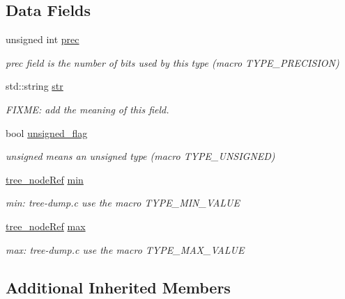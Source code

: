 \subsection*{Data Fields}
\begin{DoxyCompactItemize}
\item 
unsigned int \hyperlink{structinteger__type_a2ef406fca15b8099f36caa9e7af56a8f}{prec}
\begin{DoxyCompactList}\small\item\em prec field is the number of bits used by this type (macro T\+Y\+P\+E\+\_\+\+P\+R\+E\+C\+I\+S\+I\+ON) \end{DoxyCompactList}\item 
std\+::string \hyperlink{structinteger__type_a734d8c7ea62046a0bb29a0c162aeb5dd}{str}
\begin{DoxyCompactList}\small\item\em F\+I\+X\+ME\+: add the meaning of this field. \end{DoxyCompactList}\item 
bool \hyperlink{structinteger__type_afa53c2ecd072946b7a3eb8c3db186297}{unsigned\+\_\+flag}
\begin{DoxyCompactList}\small\item\em unsigned means an unsigned type (macro T\+Y\+P\+E\+\_\+\+U\+N\+S\+I\+G\+N\+ED) \end{DoxyCompactList}\item 
\hyperlink{tree__node_8hpp_a6ee377554d1c4871ad66a337eaa67fd5}{tree\+\_\+node\+Ref} \hyperlink{structinteger__type_aa20c7b9a0e31604abba7c9c6ab9e3c85}{min}
\begin{DoxyCompactList}\small\item\em min\+: tree-\/dump.\+c use the macro T\+Y\+P\+E\+\_\+\+M\+I\+N\+\_\+\+V\+A\+L\+UE \end{DoxyCompactList}\item 
\hyperlink{tree__node_8hpp_a6ee377554d1c4871ad66a337eaa67fd5}{tree\+\_\+node\+Ref} \hyperlink{structinteger__type_a85713610c9a1ff37771373ed2faf0e0a}{max}
\begin{DoxyCompactList}\small\item\em max\+: tree-\/dump.\+c use the macro T\+Y\+P\+E\+\_\+\+M\+A\+X\+\_\+\+V\+A\+L\+UE \end{DoxyCompactList}\end{DoxyCompactItemize}
\subsection*{Additional Inherited Members}


